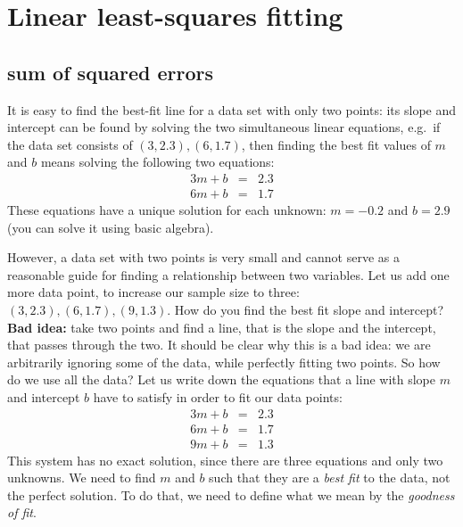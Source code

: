 \documentclass[
]{book}
\theoremstyle{definition}
\theoremstyle{definition}
\theoremstyle{definition}
\theoremstyle{remark}
\begin{document}
\hypertarget{linear-least-squares-fitting}{%
\section{Linear least-squares fitting}\label{linear-least-squares-fitting}}

\label{sec:math8}

\hypertarget{sum-of-squared-errors}{%
\subsection{sum of squared errors}\label{sum-of-squared-errors}}

It is easy to find the best-fit line for a data set with only two points: its slope and intercept can be found by solving the two simultaneous linear equations, e.g.~if the data set consists of \((3,2.3), (6, 1.7)\), then finding the best fit values of \(m\) and \(b\) means solving the following two equations:
\begin{eqnarray*}
3m + b &=&  2.3 \\
6m + b &=& 1.7
\end{eqnarray*}
These equations have a unique solution for each unknown: \(m=-0.2\) and \(b=2.9\) (you can solve it using basic algebra).

However, a data set with two points is very small and cannot serve as a reasonable guide for finding a relationship between two variables. Let us add one more data point, to increase our sample size to three: \((3,2.3), (6, 1.7), (9, 1.3)\). How do you find the best fit slope and intercept? \textbf{Bad idea:} take two points and find a line, that is the slope and the intercept, that passes through the two. It should be clear why this is a bad idea: we are arbitrarily ignoring some of the data, while perfectly fitting two points. So how do we use all the data? Let us write down the equations that a line with slope \(m\) and intercept \(b\) have to satisfy in order to fit our data points:
\begin{eqnarray*}
3m + b &=&  2.3 \\
6m + b &=& 1.7 \\
9m + b &=& 1.3
\end{eqnarray*}
This system has no exact solution, since there are three equations and only two unknowns. We need to find \(m\) and \(b\) such that they are a \emph{best fit} to the data, not the perfect solution. To do that, we need to define what we mean by the  \emph{goodness of fit}.
\end{document}
